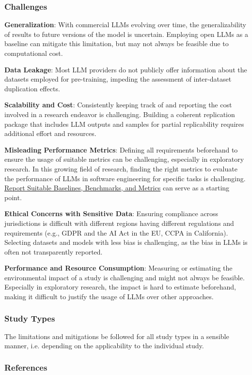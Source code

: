 \subsubsection{Challenges}
\textbf{Generalization}:
With commercial LLMs evolving over time, the generalizability of results to future versions of the model is uncertain. Employing open LLMs as a baseline can mitigate this limitation, but may not always be feasible due to computational cost.

\textbf{Data Leakage}:
Most LLM providers do not publicly offer information about the datasets employed for pre-training, impeding the assessment of inter-dataset duplication effects.

\textbf{Scalability and Cost}:
Consistently keeping track of and reporting the cost involved in a research endeavor is challenging.
Building a coherent replication package that includes LLM outputs and samples for partial replicability requires additional effort and resources.

\textbf{Misleading Performance Metrics}:
Defining all requirements beforehand to ensure the usage of suitable metrics can be challenging, especially in exploratory research.
In this growing field of research, finding the right metrics to evaluate the performance of LLMs in software engineering for specific tasks is challenging. \href{/guidelines/report-baselines-benchmarks-and-metrics}{Report Suitable Baselines, Benchmarks, and Metrics} can serve as a starting point.

\textbf{Ethical Concerns with Sensitive Data}:
Ensuring compliance across jurisdictions is difficult with different regions having different regulations and requirements (e.g., GDPR and the AI Act in the EU, CCPA in California).
Selecting datasets and models with less bias is challenging, as the bias in LLMs is often not transparently reported.

\textbf{Performance and Resource Consumption}:
Measuring or estimating the environmental impact of a study is challenging and might not always be feasible. Especially in exploratory research, the impact is hard to estimate beforehand, making it difficult to justify the usage of LLMs over other approaches.

\subsubsection{Study Types}
The limitations and mitigations \should be followed for all study types in a sensible manner, i.e. depending on the applicability to the individual study.


\subsubsection{References}





